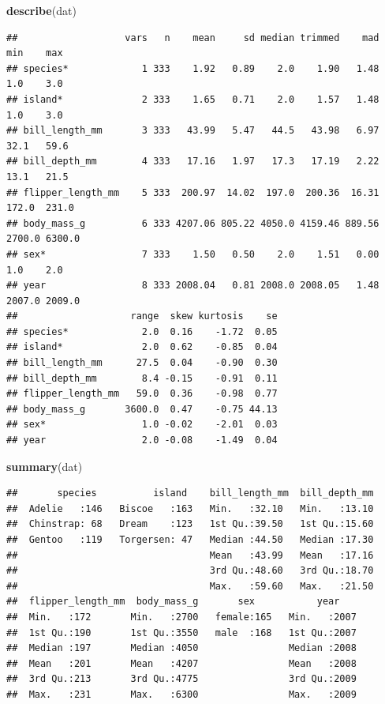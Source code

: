 \documentclass[
]{book}
\newenvironment{Shaded}{\begin{snugshade}}{\end{snugshade}}
\newcommand{\FunctionTok}[1]{\textcolor[rgb]{0.13,0.29,0.53}{\textbf{#1}}}
\newcommand{\NormalTok}[1]{#1}
\begin{document}
\begin{Shaded}
\begin{Highlighting}[]
\FunctionTok{describe}\NormalTok{(dat)}
\end{Highlighting}
\end{Shaded}

\begin{verbatim}
##                   vars   n    mean     sd median trimmed    mad    min    max
## species*             1 333    1.92   0.89    2.0    1.90   1.48    1.0    3.0
## island*              2 333    1.65   0.71    2.0    1.57   1.48    1.0    3.0
## bill_length_mm       3 333   43.99   5.47   44.5   43.98   6.97   32.1   59.6
## bill_depth_mm        4 333   17.16   1.97   17.3   17.19   2.22   13.1   21.5
## flipper_length_mm    5 333  200.97  14.02  197.0  200.36  16.31  172.0  231.0
## body_mass_g          6 333 4207.06 805.22 4050.0 4159.46 889.56 2700.0 6300.0
## sex*                 7 333    1.50   0.50    2.0    1.51   0.00    1.0    2.0
## year                 8 333 2008.04   0.81 2008.0 2008.05   1.48 2007.0 2009.0
##                    range  skew kurtosis    se
## species*             2.0  0.16    -1.72  0.05
## island*              2.0  0.62    -0.85  0.04
## bill_length_mm      27.5  0.04    -0.90  0.30
## bill_depth_mm        8.4 -0.15    -0.91  0.11
## flipper_length_mm   59.0  0.36    -0.98  0.77
## body_mass_g       3600.0  0.47    -0.75 44.13
## sex*                 1.0 -0.02    -2.01  0.03
## year                 2.0 -0.08    -1.49  0.04
\end{verbatim}

\begin{Shaded}
\begin{Highlighting}[]
\FunctionTok{summary}\NormalTok{(dat)}
\end{Highlighting}
\end{Shaded}

\begin{verbatim}
##       species          island    bill_length_mm  bill_depth_mm  
##  Adelie   :146   Biscoe   :163   Min.   :32.10   Min.   :13.10  
##  Chinstrap: 68   Dream    :123   1st Qu.:39.50   1st Qu.:15.60  
##  Gentoo   :119   Torgersen: 47   Median :44.50   Median :17.30  
##                                  Mean   :43.99   Mean   :17.16  
##                                  3rd Qu.:48.60   3rd Qu.:18.70  
##                                  Max.   :59.60   Max.   :21.50  
##  flipper_length_mm  body_mass_g       sex           year     
##  Min.   :172       Min.   :2700   female:165   Min.   :2007  
##  1st Qu.:190       1st Qu.:3550   male  :168   1st Qu.:2007  
##  Median :197       Median :4050                Median :2008  
##  Mean   :201       Mean   :4207                Mean   :2008  
##  3rd Qu.:213       3rd Qu.:4775                3rd Qu.:2009  
##  Max.   :231       Max.   :6300                Max.   :2009
\end{verbatim}
\end{document}
